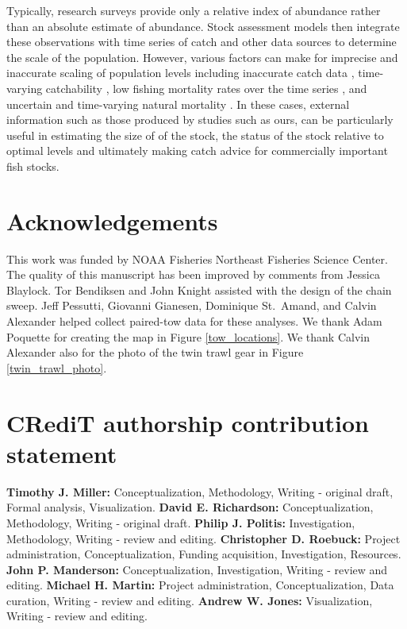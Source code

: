\documentclass[
  12pt,
]{article}
\begin{document}
Typically, research surveys provide only a relative index of abundance
rather than an absolute estimate of abundance. Stock assessment models
then integrate these observations with time series of catch and other
data sources to determine the scale of the population. However, various
factors can make for imprecise and inaccurate scaling of population
levels including inaccurate catch data \citep{cadigan16}, time-varying
catchability \citep{wilbergetal09}, low fishing mortality rates over the
time series \citep{adamsetal15}, and uncertain and time-varying natural
mortality \citep{stocketal21}. In these cases, external information such
as those produced by studies such as ours, can be particularly useful in
estimating the size of of the stock, the status of the stock relative to
optimal levels and ultimately making catch advice for commercially
important fish stocks.

\hypertarget{acknowledgements}{%
\section*{Acknowledgements}\label{acknowledgements}}

This work was funded by NOAA Fisheries Northeast Fisheries Science
Center. The quality of this manuscript has been improved by comments
from Jessica Blaylock. Tor Bendiksen and John Knight assisted with the
design of the chain sweep. Jeff Pessutti, Giovanni Gianesen, Dominique
St.~Amand, and Calvin Alexander helped collect paired-tow data for these
analyses. We thank Adam Poquette for creating the map in Figure
\ref{tow_locations}. We thank Calvin Alexander also for the photo of the
twin trawl gear in Figure \ref{twin_trawl_photo}.

\hypertarget{credit-authorship-contribution-statement}{%
\section*{CRediT authorship contribution
statement}\label{credit-authorship-contribution-statement}}

\textbf{Timothy J. Miller:} Conceptualization, Methodology, Writing -
original draft, Formal analysis, Visualization. \textbf{David E.
Richardson:} Conceptualization, Methodology, Writing - original draft.
\textbf{Philip J. Politis:} Investigation, Methodology, Writing - review
and editing. \textbf{Christopher D. Roebuck:} Project administration,
Conceptualization, Funding acquisition, Investigation, Resources.
\textbf{John P. Manderson:} Conceptualization, Investigation, Writing -
review and editing. \textbf{Michael H. Martin:} Project administration,
Conceptualization, Data curation, Writing - review and editing.
\textbf{Andrew W. Jones:} Visualization, Writing - review and editing.
\end{document}
